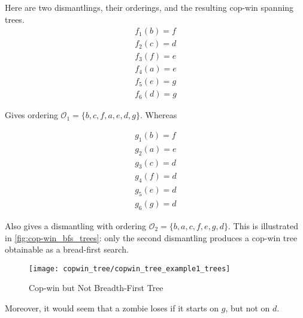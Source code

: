 Here are two dismantlings, their orderings, and the resulting cop-win spanning trees.
\begin{align*}
  f_1(b) = f \\
  f_2(c) = d \\
  f_3(f) = e \\
  f_4(a) = e \\
  f_5(e) = g \\
  f_6(d) = g
\end{align*}

Gives ordering $\mathcal{O}_1 = \{ b, c, f, a, e, d, g \}$. Whereas

\begin{align*}
  g_1(b) = f \\
  g_2(a) = e \\
  g_3(c) = d \\
  g_4(f) = d \\
  g_5(e) = d \\
  g_6(g) = d
\end{align*}

Also gives a dismantling with ordering $\mathcal{O}_2 = \{b, a, c, f, e, g, d \}$.
This is illustrated in \ref{fig:cop-win_bfs_trees}: only the second dismantling
produces a cop-win tree obtainable as a bread-first search.

\begin{figure}
\centering
\texttt{[image: copwin\_tree/copwin\_tree\_example1\_trees]}
\caption{Cop-win but Not Breadth-First Tree \label{fig:copwin_bfs_trees}}
\end{figure}

Moreover, it would seem that a zombie loses if it starts on $g$, but not on $d$.
